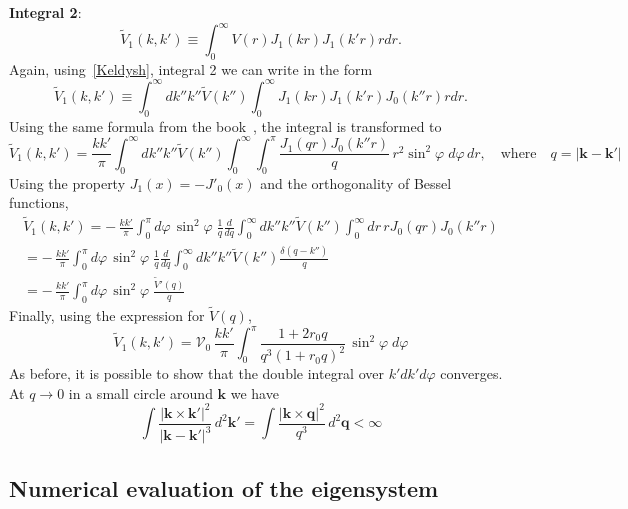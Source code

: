 \documentclass[
aps,
prl,
groupedaddress,
superscriptaddress,
floatfix,
notitlepage
]{revtex4-1}
\begin{document}
\medskip

{\bf Integral 2}:
$$
\tilde{V}_{1}(k,k') \equiv \int_0^\infty V(r) J_{1}(kr) J_{1}(k'r) r dr.
$$
Again, using~\eqref{Keldysh}, integral 2 we can write in the form
$$
\tilde{V}_{1}(k,k') \equiv \int_0^\infty dk'' k'' \tilde{V}(k'') \int_0^\infty J_{1}(kr) J_{1}(k'r) J_0(k'' r) r dr.
$$
Using the same formula from the book~\cite{Watson-book}, 
the integral is transformed to
\begin{equation}
\tilde{V}_{1}(k,k') = \frac{kk'}{\pi} \int_0^\infty dk'' k'' \tilde{V}(k'')  \int_0^\infty \int_0^\pi   
\frac{J_{1}\left(q r\right) J_0(k'' r)}{q} \,r^2\sin^2\varphi\; d\varphi\,  dr,
\quad\text{where}\quad q=|\mathbf{k}-\mathbf{k}'|
\label{V1kk'}
\end{equation}
Using the property $J_1(x)=-J'_0(x)$ and the orthogonality of Bessel functions,
\begin{multline}
\tilde{V}_{1}(k,k') = -\, \frac{kk'}{\pi}     \int_0^\pi d\varphi\,\sin^2\varphi\;
\frac{1}{q} \frac{d}{dq} \int_0^\infty dk'' k''\tilde{V}(k'') \int_0^\infty dr\,r J_0\left(q r\right) J_0(k'' r) \\
= -\, \frac{kk'}{\pi}     \int_0^\pi d\varphi\,\sin^2\varphi\;
\frac{1}{q} \frac{d}{dq} \int_0^\infty dk'' k''\tilde{V}(k'') \frac{\delta(q-k'')}{q} \\
= -\, \frac{kk'}{\pi}     \int_0^\pi d\varphi\,\sin^2\varphi\;
\frac{\tilde{V}'(q)}{q}
\end{multline}
Finally, using the expression for $\tilde{V}(q)$,
$$
\boxed{
\tilde{V}_{1}(k,k') = \mathcal{V}_0\,\frac{kk'}{\pi}     \int_0^\pi 
\frac{1+2r_0q}{q^3(1+r_0q)^2}\, \sin^2\varphi\; d\varphi
}
$$
As before, it is possible to show that the double integral over $k' dk' d\varphi$ converges. At $q\to 0$ in a small circle around $\mathbf{k}$ we have
$$
\int \frac{|\mathbf{k}\times\mathbf{k}'|^2}{|\mathbf{k}-\mathbf{k}'|^3}\,d^2\mathbf{k}'
=\int \frac{|\mathbf{k}\times\mathbf{q}|^2}{q^3}\,d^2\mathbf{q} < \infty
$$

\subsection{Numerical evaluation of the eigensystem}
\end{document}
